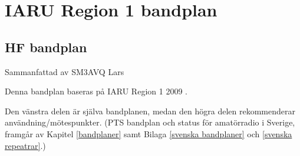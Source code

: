 \chapter{IARU Region 1 bandplan}
\label{IARU bandplan}

\section{HF bandplan}

Sammanfattad av SM3AVQ Lars

Denna bandplan baseras på IARU Region 1 2009 \cite{IARU1}.


Den vänstra delen är själva bandplanen, medan den högra delen rekommenderar användning/mötespunkter.
(PTS bandplan och status för amatörradio i Sverige, framgår av Kapitel \ref{bandplaner} samt Bilaga \ref{svenska bandplaner} och \ref{svenska repeatrar}.)

